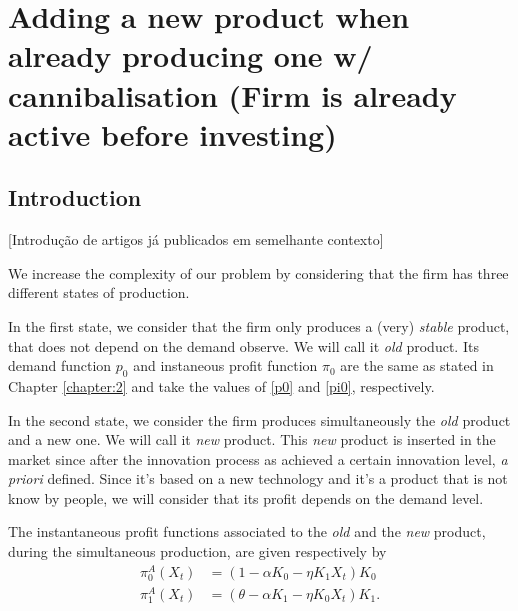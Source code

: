 
\chapter{Adding a new product when already producing one w/ cannibalisation (Firm is already active before investing)}
\label{chapter:3}



\section{Introduction}
\label{section:2_intro}

[Introdução de artigos já publicados em semelhante contexto]

We increase the complexity of our problem by considering that the firm has three different states of production.

In the first state, we consider that the firm only produces a (very) \textit{stable} product, that does not depend on the demand observe. We will call it \textit{old} product. Its demand function $p_0$ and instaneous profit function $\pi_0$ are the same as stated in Chapter \ref{chapter:2} and take the values of \eqref{p0} and \eqref{pi0}, respectively.

In the second state, we consider the firm produces simultaneously the \textit{old} product and a new one. We will call it \textit{new} product. This \textit{new} product is inserted in the market since after the innovation process as achieved a certain innovation level, \textit{a priori} defined. Since it's based on a new technology and it's a product that is not know by people, we will consider that its profit depends on the demand level.

The instantaneous profit functions associated to the \textit{old} and the \textit{new} product, during the simultaneous production, are given respectively by
\begin{align}
\pi_0^A(X_t)&=(1-\alpha K_0-\eta K_1 X_t) K_0\\
\pi_1^A(X_t)&=(\theta-\alpha K_1-\eta K_0 X_t) K_1.
\end{align}


